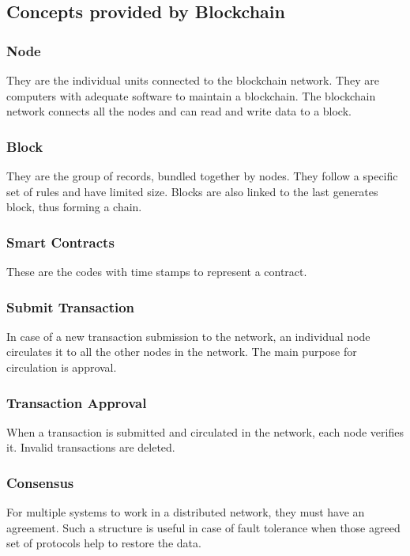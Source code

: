 \documentclass[sigconf]{acmart}
\begin{document}
\subsection{Concepts provided by Blockchain}

\subsubsection{Node}
They are the individual units connected to the blockchain network. They are computers with adequate software to maintain a blockchain\cite{pabc1}\cite{pabc2}. The blockchain network connects all the nodes and can read and write data to a block.

\subsubsection{Block}
They are the group of records, bundled together by nodes. They follow a specific set of rules and have limited size. Blocks are also linked to the last generates block, thus forming a chain\cite{pabc1}.

\subsubsection{Smart Contracts}
These are the codes with time stamps to represent a contract\cite{pabc1}.

\subsubsection{Submit Transaction}
In case of a new transaction submission to the network, an individual node circulates it to all the other nodes in the network\cite{pabc1}. The main purpose for circulation is approval. 

\subsubsection{Transaction Approval}
When a transaction is submitted and circulated in the network, each node verifies it. Invalid transactions are deleted\cite{pabc1}.

\subsubsection{Consensus}
For multiple systems to work in a distributed network, they must have an agreement. Such a structure is useful in case of fault tolerance when those agreed set of protocols help to restore the data\cite{pabc1}.
\end{document}
